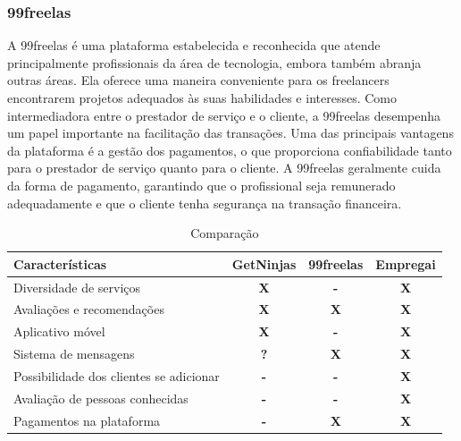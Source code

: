 \subsubsection{99freelas}
A 99freelas é uma plataforma estabelecida e reconhecida que atende principalmente profissionais da área de tecnologia, embora também abranja
outras áreas. Ela oferece uma maneira conveniente para os freelancers encontrarem projetos adequados às suas habilidades e interesses.
Como intermediadora entre o prestador de serviço e o cliente, a 99freelas desempenha um papel importante na facilitação das transações.
Uma das principais vantagens da plataforma é a gestão dos pagamentos, o que proporciona confiabilidade tanto para o prestador de serviço 
quanto para o cliente. A 99freelas geralmente cuida da forma de pagamento, garantindo que o profissional seja remunerado adequadamente e 
que o cliente tenha segurança na transação financeira.

\begin{table}[htb]
    \centering
    \caption{Comparação}
    \label{tab:comparação}
\begin{tabular}{|p{5cm}|p{2cm}|p{2cm}|p{2cm}|}
    \hline
    \textbf{Características} & \textbf{GetNinjas} & \textbf{99freelas} & \textbf{Empregai}  \\ \hline
    Diversidade de serviços   & \multicolumn{1}{c|}{\textbf{X}}   & \multicolumn{1}{c|}{\textbf{-}}  & \multicolumn{1}{c|}{\textbf{X}} \\ \hline
	Avaliações e recomendações   & \multicolumn{1}{c|}{\textbf{X}}   & \multicolumn{1}{c|}{\textbf{X}}  & \multicolumn{1}{c|}{\textbf{X}} \\ \hline
    Aplicativo móvel   & \multicolumn{1}{c|}{\textbf{X}}   & \multicolumn{1}{c|}{\textbf{-}}  & \multicolumn{1}{c|}{\textbf{X}} \\ \hline
    Sistema de mensagens   & \multicolumn{1}{c|}{\textbf{?}}   & \multicolumn{1}{c|}{\textbf{X}}  & \multicolumn{1}{c|}{\textbf{X }} \\ \hline
    Possibilidade dos clientes se adicionar   & \multicolumn{1}{c|}{\textbf{-}}   & \multicolumn{1}{c|}{\textbf{-}}  & \multicolumn{1}{c|}{\textbf{X}} \\ \hline
	Avaliação de pessoas conhecidas   & \multicolumn{1}{c|}{\textbf{-}}   & \multicolumn{1}{c|}{\textbf{-}}  & \multicolumn{1}{c|}{\textbf{X}} \\ \hline
	Pagamentos na plataforma   & \multicolumn{1}{c|}{\textbf{-}}   & \multicolumn{1}{c|}{\textbf{X}}  & \multicolumn{1}{c|}{\textbf{X}} \\ \hline
\end{tabular}
\end{table}

